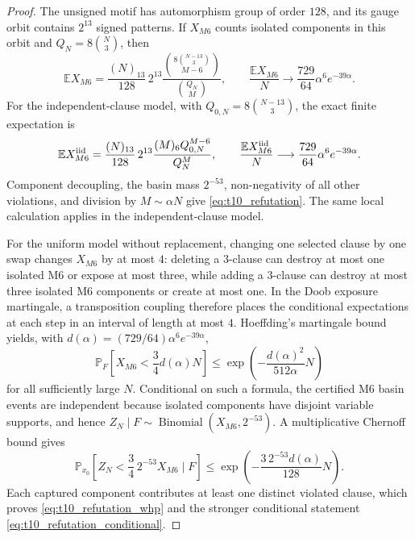 \documentclass[11pt,a4paper]{article}
\begin{document}
\begin{proof}
The unsigned motif has automorphism group of order $128$, and its gauge orbit
contains $2^{13}$ signed patterns.  If $X_{M6}$ counts isolated components in
this orbit and $Q_N=8\binom N3$, then
\begin{equation}
\mathbb E X_{M6}=\frac{(N)_{13}}{128}\,2^{13}
\frac{\binom{8\binom{N-13}{3}}{M-6}}{\binom{Q_N}{M}},
\qquad
\frac{\mathbb E X_{M6}}N\longrightarrow
\frac{729}{64}\alpha^6e^{-39\alpha}.
\end{equation}
For the independent-clause model, with
$Q_{0,N}=8\binom{N-13}{3}$, the exact finite expectation is
\begin{equation}
\mathbb E X_{M6}^{\rm iid}
=\frac{(N)_{13}}{128}\,2^{13}
\frac{(M)_6Q_{0,N}^{M-6}}{Q_N^M},
\qquad
\frac{\mathbb E X_{M6}^{\rm iid}}N\longrightarrow
\frac{729}{64}\alpha^6e^{-39\alpha}.
\end{equation}
Component decoupling, the basin mass $2^{-53}$, non-negativity of all other
violations, and division by $M\sim\alpha N$ give
\eqref{eq:t10_refutation}.  The same local
calculation applies in the independent-clause model.

For the uniform model without replacement, changing one selected clause by
one swap changes $X_{M6}$ by at most $4$: deleting a 3-clause can destroy at
most one isolated M6 or expose at most three, while adding a 3-clause can
destroy at most three isolated M6 components or create at most one.  In the
Doob exposure martingale, a transposition coupling therefore places the
conditional expectations at each step in an interval of length at most $4$.
Hoeffding's martingale bound yields, with
$d(\alpha)=(729/64)\alpha^6e^{-39\alpha}$,
\[
\mathbb P_F\left[X_{M6}<\frac34d(\alpha)N\right]
\le
\exp\!\left(-\frac{d(\alpha)^2}{512\alpha}N\right)
\]
for all sufficiently large $N$.  Conditional on such a formula, the
certified M6 basin events are independent because isolated components have
disjoint variable supports, and hence
$Z_N\mid F\sim\operatorname{Binomial}(X_{M6},2^{-53})$.
A multiplicative Chernoff bound gives
\[
\mathbb P_{x_0}\left[
Z_N<\frac34\,2^{-53}X_{M6}\mid F
\right]
\le
\exp\!\left(-\frac{3\,2^{-53}d(\alpha)}{128}N\right).
\]
Each captured component contributes at least one distinct violated clause,
which proves \eqref{eq:t10_refutation_whp} and the stronger conditional
statement \eqref{eq:t10_refutation_conditional}.
\end{proof}
\end{document}
